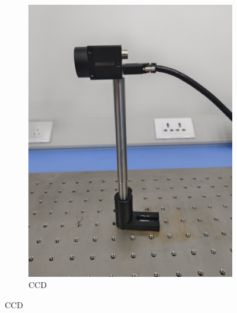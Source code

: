 \documentclass[a4paper]{report} %
\begin{document}
\begin{figure}[H]
\begin{subfigure}{0.22\textwidth}
        \includegraphics[width=\linewidth]{CCD.jpg}
        \caption{CCD}
    \end{subfigure}


\end{figure}
\end{document}
